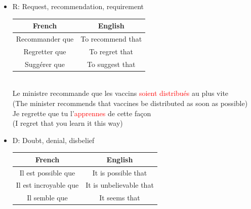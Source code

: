 \documentclass{book}
\begin{document}
\begin{itemize}
\begin{itemize}
                \item Example with \textit{il vaut mieux}, here is (S'en aller):
                \begin{center}
                    Il vaut mieux que tu \textcolor{red}{t'en ailles} (It's better that you leave)
                \end{center}
            \end{itemize}
            \item R: Request, recommendation, requirement
            \begin{center}
                \begin{tabular}{|c|c|}
                    \hline
                    \textbf{French} & \textbf{English} \\
                    \hline
                    Recommander que & To recommend that \\
                    \hline
                    Regretter que & To regret that \\
                    \hline
                    Suggérer que & To suggest that \\
                    \hline
                \end{tabular} \\
                \vspace{0.2cm}
                Le ministre recommande que les vaccins \textcolor{red}{soient distribués} au plus vite \\
                (The minister recommends that vaccines be distributed as soon as possible) \\
                Je regrette que tu l'\textcolor{red}{apprennes} de cette façon \\
                (I regret that you learn it this way)
            \end{center}
            \item D: Doubt, denial, disbelief
            \begin{center}
                \begin{tabular}{|c|c|}
                    \hline
                    \textbf{French} & \textbf{English} \\
                    \hline
                    Il est possible que & It is possible that \\
                    \hline
                    Il est incroyable que & It is unbelievable that \\
                    Il semble que & It seems that \\

\end{tabular}
\end{center}
\end{itemize}
\end{document}
